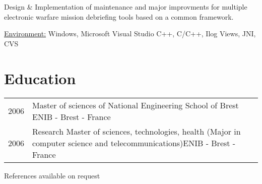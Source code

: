 \documentclass[10pt,letterpaper]{resume/resume}
\begin{document}
\begin{minipage}[t]{\linewidth}
\par Design \& Implementation of maintenance and major improvments for multiple electronic warfare mission debriefing tools based on a common framework.
\par\underline{Environment:} Windows, Microsoft Visual Studio C++, C/C++, Ilog Views, JNI, CVS
%
%
  \end{minipage}

  \begin{minipage}[t]{\linewidth}
    \section{Education}
      \begin{tabularx}{\linewidth}{lX}%
        2006 & Master of sciences of National Engineering School of Brest \hfill ENIB - Brest - France\\ 
        2006 & Research Master of sciences, technologies, health (Major in computer science and telecommunications)\hfill ENIB - Brest - France\\
      \end{tabularx}%
  \end{minipage}

  \vfill
  \begin{center}References available on request\end{center}
\end{document}
